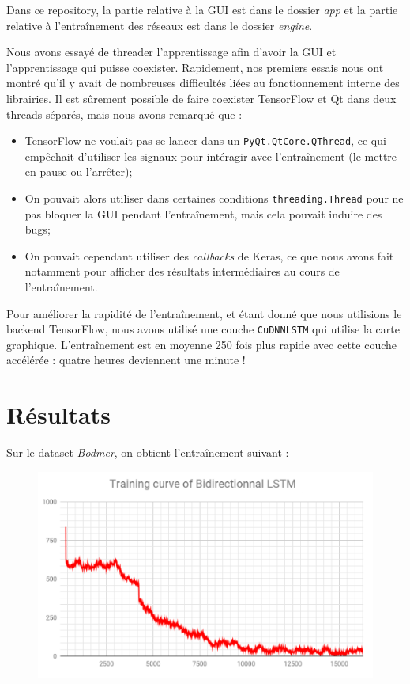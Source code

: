 \documentclass{report}
\begin{document}
Dans ce repository, la partie relative à la GUI est dans le dossier \textit{app} et la partie relative à l'entraînement des réseaux est dans le dossier \textit{engine}.

Nous avons essayé de threader l'apprentissage afin d'avoir la GUI et l'apprentissage qui puisse coexister.
Rapidement, nos premiers essais nous ont montré qu'il y avait de nombreuses difficultés liées au fonctionnement interne des librairies.
Il est sûrement possible de faire coexister TensorFlow et Qt dans deux threads séparés, mais nous avons remarqué que :
\begin{itemize}
	\item TensorFlow ne voulait pas se lancer dans un \texttt{PyQt.QtCore.QThread}, ce qui empêchait d'utiliser les signaux pour intéragir avec l'entraînement (le mettre en pause ou l'arrêter);
	\item On pouvait alors utiliser dans certaines conditions \texttt{threading.Thread} pour ne pas bloquer la GUI pendant l'entraînement, mais cela pouvait induire des bugs;
	\item On pouvait cependant utiliser des \textit{callbacks} de Keras, ce que nous avons fait notamment pour afficher des résultats intermédiaires au cours de l'entraînement.
\end{itemize}

Pour améliorer la rapidité de l'entraînement, et étant donné que nous utilisions le backend TensorFlow, nous avons utilisé une couche \texttt{CuDNNLSTM} qui utilise la carte graphique.
L'entraînement est en moyenne 250 fois plus rapide avec cette couche accélérée : quatre heures deviennent une minute !

\section{Résultats}

Sur le dataset \textit{Bodmer}, on obtient l'entraînement suivant :

\begin{figure}[!htb]
	\begin{center}
		\includegraphics[width=0.7\linewidth]{img/keras-traincurve.png}
	\end{center}
\end{figure}
\end{document}
